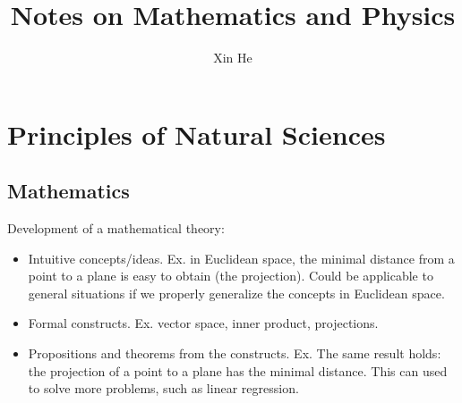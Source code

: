 \documentclass{report}
\title{Notes on Mathematics and Physics}
\author{Xin He}
\begin{document}
\tableofcontents

\newcommand\independent{\protect\mathpalette{\protect\independenT}{\perp}}
    \def\independenT#1#2{\mathrel{\setbox0\hbox{$#1#2$}%
    \copy0\kern-\wd0\mkern4mu\box0}}

\def\Var{{\rm Var}\,}
\def\E{{\rm E}\,}
\def\Cov{{\rm Cov}\,}
\def\tr{{\rm tr}\,}
\def\diag{{\rm Diag}} 

\providecommand{\abs}[1]{\lvert#1\rvert}
\providecommand{\norm}[1]{\lVert#1\rVert}

\chapter{Principles of Natural Sciences}

\section{Mathematics}

Development of a mathematical theory: 
\begin{itemize}
	\item Intuitive concepts/ideas. Ex. in Euclidean space, the minimal distance from a point to a plane is easy to obtain (the projection). Could be applicable to general situations if we properly generalize the concepts in Euclidean space.
	
	\item Formal constructs. Ex. vector space, inner product, projections. 
	
	\item Propositions and theorems from the constructs. Ex. The same result holds: the projection of a point to a plane has the minimal distance. This can used to solve more problems, such as linear regression. 
\end{itemize}
\end{document}
